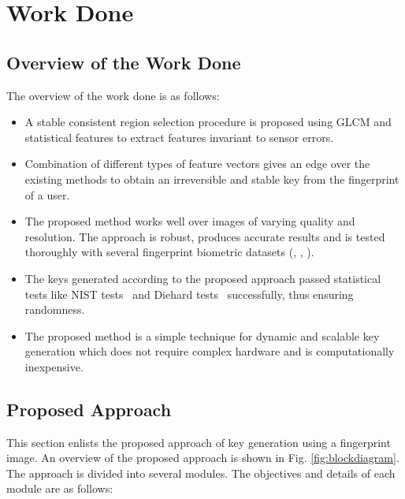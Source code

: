 
% 
% 
\section{Work Done}

\label{work_done}

\subsection{Overview of the Work Done}
The overview of the work done is as follows:
\begin{itemize}
	\item A stable consistent region selection procedure is proposed using GLCM
	      and statistical features to extract features invariant to sensor errors.
	\item Combination of different types of feature vectors gives an edge over
	      the existing methods to obtain an irreversible and stable key from the
	      fingerprint of a user.
	\item The proposed method works well over images of varying quality and
	      resolution. The approach is robust, produces accurate results and is tested
	      thoroughly with several fingerprint biometric datasets
	      (\cite{maio2002fvc2002}, \cite{maio2004fvc2004}, \cite{polyu2016database}).
	\item The keys generated according to the proposed approach passed
	      statistical tests like NIST tests~\cite{pareschi2012statistical} and Diehard
	      tests~\cite{marsaglia1998diehard} successfully, thus ensuring randomness.
	\item The proposed method is a simple technique for dynamic and scalable key
	      generation which does not require complex hardware and is computationally
	      inexpensive.
\end{itemize}

\subsection{Proposed Approach}
This section enlists the proposed approach of key generation using a
fingerprint image. An overview of the proposed approach is shown in
Fig. \ref{fig:blockdiagram}. The approach is divided into several modules. The
objectives and details of each module are as follows:


